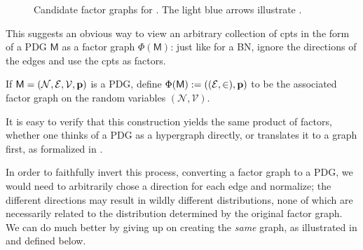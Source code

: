 \documentclass{article}
\newcommand{\V}{\mathcal V}
\newcommand{\N}{\mathcal N}
\newcommand{\Ed}{\mathcal E}
\newcommand{\sfM}{\mathsf M}
\numberwithin{equation}{section}
\begin{document}
\begin{figure}[h]
\begin{subfigure}[b]{0.3\linewidth}
{}
			\caption{}\label{subfig:fg-smoking}
		\end{subfigure}%
		\caption{Candidate factor graphs for . The light blue arrows illustrate .}
		\label{fig:fg-intro-examples}
	\end{figure}
	
	This suggests an obvious way to view an arbitrary collection
        of cpts in the form of a PDG $\sfM$ as a factor graph
        $\Phi(\sfM)$: just like for a BN, ignore the directions of the
        edges and use the cpts as factors. 
	\begin{defn}
		If $\sfM = \mnvars[]$ is a PDG, define 
		$ \Phi(\sfM) := ((\Ed,\in), \mat p)$
		to be the associated factor graph on the random variables $(\N, \V)$.
	\end{defn}
	\begin{remark}
		It is easy to verify that this construction yields the
                same product of factors, whether one thinks of a PDG
                as a hypergraph directly, or translates it to a graph
                first, as formalized in . 
	\end{remark}

	In order to faithfully invert this process, converting a
        factor graph to a PDG, we would need to arbitrarily chose a
        direction for each edge and normalize; the different
        directions may result in wildly different distributions, none of
        which are necessarily related to the distribution determined
        by the original factor
        graph. We can do much better by giving up on creating
        the \emph{same} graph, as illustrated in  and
        defined below.  
	
\end{document}
